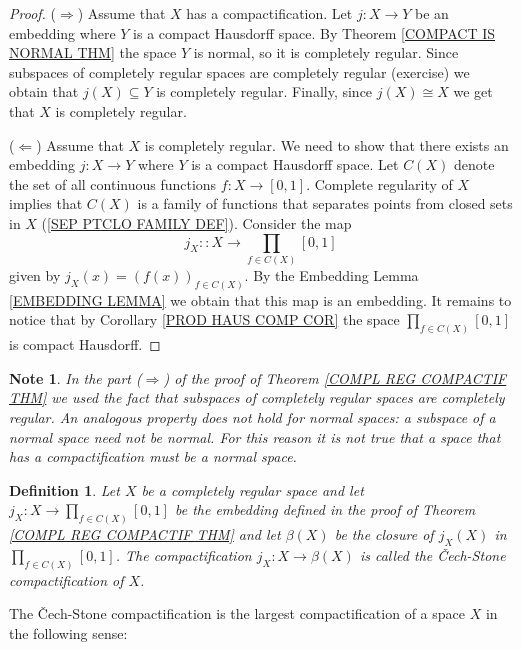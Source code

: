 \documentclass[11pt, letterpaper, oneside]{report}
\theoremstyle{pplain}
\newtheorem{ITERMVALUE THM}[theorem]{Intermediate Value Theorem}
\newtheorem{HEINEBOREL THM}[theorem]{Heine-Borel Theorem}
\newtheorem{UMETR THM}[theorem]{Urysohn Metrization Theorem}
\newtheorem{UMETR2 THM}[theorem]{Urysohn Metrization Theorem (v.2)}
\theoremstyle{ddefinition}
\newtheorem{definition}[theorem]{Definition}
\newtheorem{note}[theorem]{Note}
\theoremstyle{nnn}
\newtheorem{TDA NN}[theorem]{Topological Data Analysis. }
\theoremstyle{eexercise}
\newcommand{\Ra}{\Rightarrow}
\newcommand{\La}{\Leftarrow}
\begin{document}
\begin{proof}
($\Ra$) Assume that $X$ has a compactification. Let $j\colon X\to Y$ be an embedding 
where $Y$  is a compact Hausdorff space. By Theorem \ref{COMPACT IS NORMAL THM} 
the space $Y$ is normal, so it is completely regular. Since subspaces of completely regular 
spaces are completely regular (exercise) we obtain that $j(X)\subseteq Y$ is completely 
regular. Finally, since $j(X)\cong X$ we get that $X$ is completely regular. 


($\La$) Assume that $X$ is completely regular. We need to show that there 
exists an embedding $j\colon X\to Y$ where $Y$ is a compact Hausdorff space. 
Let $C(X)$ denote the set of all continuous functions $f\colon X \to [0, 1]$.  
Complete regularity of $X$ implies that $C(X)$ is a family of functions that separates 
points from closed sets in $X$  (\ref{SEP PTCLO FAMILY DEF}). Consider the map 
$$j_{X} \colon \colon X \to \prod_{f\in C(X)} [0, 1]$$
given by $j_{X}(x) = (f(x))_{f\in C(X)}$. By the Embedding Lemma  \ref{EMBEDDING LEMMA}  
we obtain that this map is an embedding. 
It remains to notice that by Corollary \ref{PROD HAUS COMP COR}  the space 
$\prod_{f\in C(X)} [0, 1]$ is compact Hausdorff.
\end{proof}


\begin{note}
In the part ($\Ra$) of the proof of Theorem \ref{COMPL REG COMPACTIF THM}
we used the fact that subspaces of completely regular 
spaces are completely regular. An analogous property does not hold for normal spaces: 
a subspace of a normal space need not  be normal. For this reason it is not true that 
a space that has a compactification must be a normal space. 
\end{note}

\begin{definition}
\label{CECH STONE COMPACTIF DEF}
Let $X$ be a completely regular space and let
$j_{X}\colon X \to \prod_{f\in C(X)} [0, 1]$ be the embedding defined in the proof of  
Theorem \ref{COMPL REG COMPACTIF THM} and let $\beta(X)$ be the closure of  $j_{X}(X)$
in $\prod_{f\in C(X)} [0, 1]$. The compactification $j_{X}\colon X \to \beta(X)$ is called the
\emph{\v{C}ech-Stone compactification} of $X$.   
\end{definition}

The \v{C}ech-Stone compactification is the largest compactification of a space $X$ in the following sense:
\end{document}
